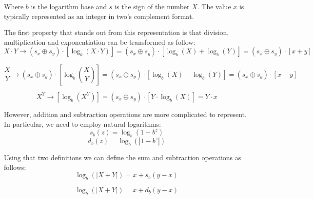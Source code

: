 Where $b$ is the logarithm base and $s$ is the sign of the number $X$. The value $x$ is typically represented as an integer in two's complement format.

The first property that stands out from this representation is that division, multiplication and exponentiation can be transformed as follow:
\begin{equation}
    X\cdot Y \xrightarrow[]{} (s_x \oplus s_y)\cdot \left[ \log_b(X \cdot Y) \right] = (s_x \oplus s_y)\cdot \left[ \log_b(X) +  \log_b(Y) \right] = (s_x \oplus s_y)\cdot \left[ x+y \right]
\end{equation}

\begin{equation}
    \frac{X}{Y} \xrightarrow[]{} (s_x \oplus s_y)\cdot \left[ \log_b\left(\frac{X}{Y}\right) \right] = (s_x \oplus s_y)\cdot \left[ \log_b(X) -  \log_b(Y) \right] = (s_x \oplus s_y)\cdot \left[ x-y \right]
\end{equation}

\begin{equation}
    X^Y \xrightarrow[]{} \left[ \log_b(X ^ Y) \right] = (s_x \oplus s_y)\cdot \left[Y \cdot  \log_b(X)  \right] = Y\cdot x
\end{equation}

However, addition and subtraction operations are more complicated to represent. In particular, we need to employ natural logarithms:
\begin{equation}
    s_b(z) = \log_b (1 + b^z)
\end{equation}
\begin{equation}
    d_b(z) = \log_b (\left | 1 - b^z \right |)
\end{equation}

Using that two definitions we can define the sum and subtraction operations as follows:
\begin{equation}
    \log_b(|X + Y|) = x + s_b(y - x) 
\end{equation}

\begin{equation}
    \log_b(|X + Y|) = x + d_b(y - x) 
\end{equation}



